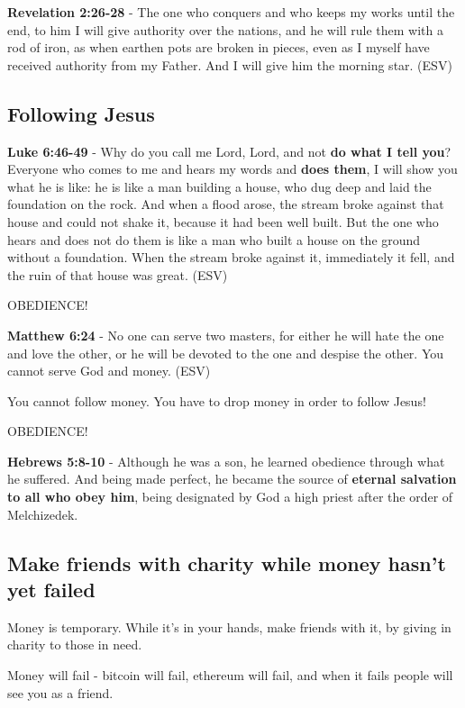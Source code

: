 \documentclass[11pt]{article}
\begin{document}
\textbf{Revelation 2:26-28} - The one who conquers and who keeps my works until the end, to him I will give authority over the nations, and he will rule them with a rod of iron, as when earthen pots are broken in pieces, even as I myself have received authority from my Father. And I will give him the morning star. (ESV)

\subsection{Following Jesus}
\label{sec:org81d2272}
\textbf{Luke 6:46-49} - Why do you call me Lord, Lord, and not \textbf{do what I tell you}? Everyone who comes to me and hears my words and \textbf{does them}, I will show you what he is like: he is like a man building a house, who dug deep and laid the foundation on the rock. And when a flood arose, the stream broke against that house and could not shake it, because it had been well built. But the one who hears and does not do them is like a man who built a house on the ground without a foundation. When the stream broke against it, immediately it fell, and the ruin of that house was great. (ESV)

OBEDIENCE!

\textbf{Matthew 6:24} - No one can serve two masters, for either he will hate the one and love the other, or he will be devoted to the one and despise the other. You cannot serve God and money. (ESV)

You cannot follow money. You have to drop money in order to follow Jesus!

OBEDIENCE!

\textbf{Hebrews 5:8-10} - Although he was a son, he learned obedience through what he suffered. And being made perfect, he became the source of \textbf{eternal salvation to all who obey him}, being designated by God a high priest after the order of Melchizedek.

\subsection{Make friends with charity while money hasn't yet failed}
\label{sec:orgbb1d1bb}
Money is temporary. While it's in your hands, make friends with it, by giving in charity to those in need.

Money will fail - bitcoin will fail, ethereum will fail, and when it fails people will see you as a friend.
\end{document}
